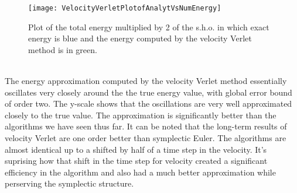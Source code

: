 \documentclass[12pt]{article}
\begin{document}
\begin{figure}[h!]
\centering
\texttt{[image: VelocityVerletPlotofAnalytVsNumEnergy]}
\caption{Plot of the total energy multiplied by 2 of the s.h.o. in which exact energy is blue and the energy computed by the velocity Verlet method is in green.}
\end{figure}
\\\indent The energy approximation computed by the velocity Verlet method essentially oscillates very closely around the the true energy value, with global error bound of order two. The y-scale shows that the oscillations are very well approximated closely to the true value. The approximation is significantly better than the algorithms we have seen thus far. It can be noted that the long-term results of velocity Verlet are one order better than symplectic Euler. The algorithms are almost identical up to a shifted by half of a time step in the velocity. It's suprising how that shift in the time step for velocity created a significant efficiency in the algorithm and also had a much better approximation while perserving the symplectic structure. 
\end{document}
